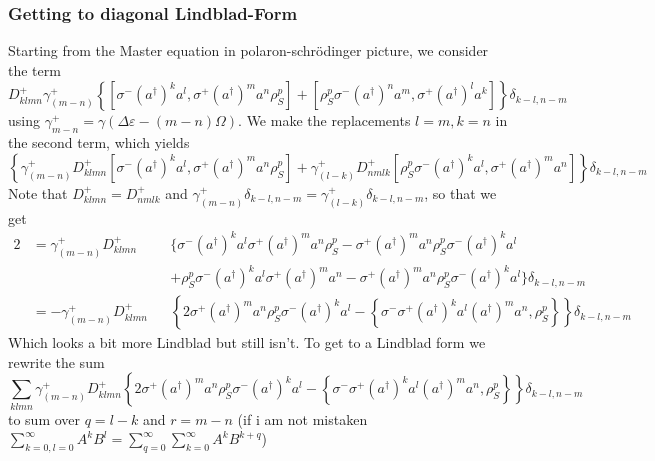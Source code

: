 	\subsubsection{Getting to diagonal Lindblad-Form}
	Starting from the Master equation in polaron-schrödinger picture, we consider the term
	\begin{equation}
		D_{klmn}^+ \gamma^+_{(m-n)} \left\{ \left[\sigma^- (a^\dagger)^k a^l, \sigma^+ (a^\dagger)^m a^n {\rho}_S^p\right] + \left[{\rho}_S^p \sigma^- (a^\dagger)^n a^m, \sigma^+ (a^\dagger)^l a^k \right] \right\} \delta_{k-l, n-m}
	\end{equation}
	using $\gamma^+_{m-n} =	\gamma(\Delta \varepsilon - (m-n)\Omega)$. We make the replacements $l = m, k =	n$ in the second term, which yields
	\begin{equation*}
		\left\{ \gamma^+_{(m-n)} D_{klmn}^+ \left[\sigma^-  (a^\dagger)^k a^l, \sigma^+ (a^\dagger)^m a^n {\rho}_S^p\right] + \gamma^+_{(l-k)} D_{nmlk}^+ \left[{\rho}_S^p \sigma^-  (a^\dagger)^k a^l, \sigma^+  (a^\dagger)^m a^n \right] \right\} \delta_{k-l, n-m}
	\end{equation*}
	Note that $D_{klmn}^+ =	D_{nmlk}^+ $ and $\gamma^+_{(m-n)} \delta_{k-l, n-m} =\gamma^+_{(l-k)}	\delta_{k-l, n-m}$, so that we get
	\begin{alignat}{2}
		&=\gamma^+_{(m-n)} D_{klmn}^+&&\{\sigma^-  (a^\dagger)^k a^l \sigma^+ (a^\dagger)^m a^n {\rho}_S^p - \sigma^+ (a^\dagger)^m a^n {\rho}_S^p \sigma^-  (a^\dagger)^k a^l \\
		&~&&+{\rho}_S^p \sigma^-  (a^\dagger)^k a^l \sigma^+  (a^\dagger)^m a^n - \sigma^+  (a^\dagger)^m a^n  {\rho}_S^p \sigma^-  (a^\dagger)^k a^l \} \delta_{k-l, n-m} \\
		&=- \gamma^+_{(m-n)} D_{klmn}^+&& \left\{2 \sigma^+ (a^\dagger)^m a^n {\rho}_S^p \sigma^-  (a^\dagger)^k a^l - \left\{\sigma^-\sigma^+  (a^\dagger)^k a^l (a^\dagger)^m a^n,  {\rho}_S^p\right\} \right\}\delta_{k-l, n-m}
	\end{alignat}
	Which looks a bit more Lindblad but still isn't. To get to a Lindblad form we rewrite the sum
	\begin{equation}
		\sum_{klmn} \gamma^+_{(m-n)} D_{klmn}^+ \left\{2 \sigma^+ (a^\dagger)^m a^n {\rho}_S^p \sigma^-  (a^\dagger)^k a^l - \left\{\sigma^-\sigma^+  (a^\dagger)^k a^l (a^\dagger)^m a^n,  {\rho}_S^p\right\} \right\}\delta_{k-l, n-m}
	\end{equation}
	to sum over $q =	l - k$ and $r =	m - n$ (if i am not mistaken $\sum_{k=0,l=0}^{\infty} A^k B^l = \sum_{q=0}^{\infty} \sum_{k=0}^{\infty} A^k B^{k+q} $)
